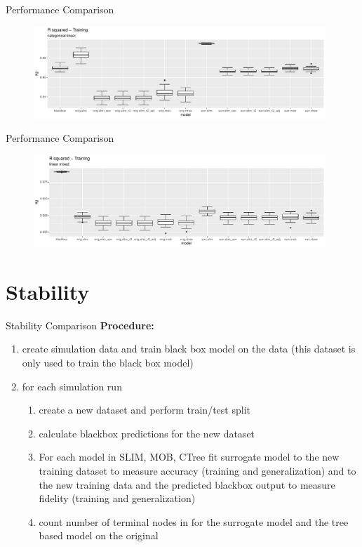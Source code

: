 \documentclass[9pt, xcolor=table]{beamer}
\begin{document}
\begin{frame}{Performance Comparison}
\begin{figure}
    \includegraphics[width=11cm]{Figures/Performance/categorical_linear/r2_train.pdf}
\end{figure}
\end{frame}

\begin{frame}{Performance Comparison}
\begin{figure}
    \includegraphics[width=11cm]{Figures/Performance/linear_mixed/r2_train.pdf}
\end{figure}
\end{frame}


\section{Stability}
\begin{frame}{Stability Comparison}
\textbf{Procedure:} 
\begin{enumerate}
    \item create simulation data and train black box model on the data (this dataset is only used to train the black box model)
    \item for each simulation run 
    \begin{enumerate}
        \item create a new dataset and perform train/test split
        \item calculate blackbox predictions for the new dataset
        \item For each model in SLIM, MOB, CTree fit surrogate model to the new training dataset to measure accuracy (training and generalization) and to the new training data and the predicted blackbox output to measure fidelity (training and generalization)
        \item count number of terminal nodes in for the surrogate model and the tree based model on the original 
    \end{enumerate}
\end{enumerate}
\end{frame}
\end{document}
